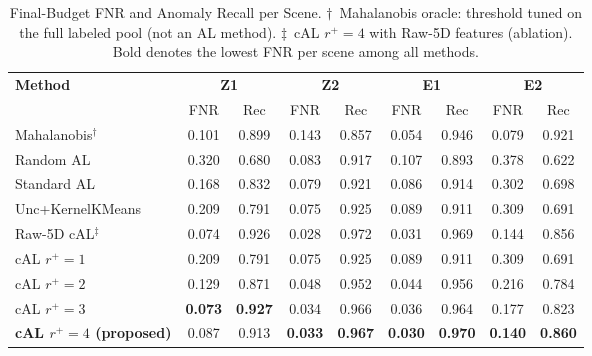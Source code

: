 %
\begin{table}[t]
\footnotesize
\centering
\caption{Final-Budget FNR and Anomaly Recall per Scene.
         $\dagger$~Mahalanobis oracle: threshold tuned on the full labeled
         pool (not an AL method).
         $\ddagger$~cAL $r^{+}=4$ with Raw-5D features (ablation).
         Bold denotes the lowest FNR per scene among all methods.}
\begin{tabular}{l c c c c c c c c}
    \toprule
    \multirow{2}{*}{\textbf{Method}}
        & \multicolumn{2}{c}{\textbf{Z1}}
        & \multicolumn{2}{c}{\textbf{Z2}}
        & \multicolumn{2}{c}{\textbf{E1}}
        & \multicolumn{2}{c}{\textbf{E2}} \\
    \cmidrule(lr){2-3}\cmidrule(lr){4-5}\cmidrule(lr){6-7}\cmidrule(lr){8-9}
        & FNR & Rec & FNR & Rec & FNR & Rec & FNR & Rec \\
    \midrule
    Mahalanobis$^\dagger$
        & 0.101 & 0.899 & 0.143 & 0.857 & 0.054 & 0.946 & 0.079 & 0.921 \\
    \midrule
    Random AL
        & 0.320 & 0.680 & 0.083 & 0.917 & 0.107 & 0.893 & 0.378 & 0.622 \\
    Standard AL
        & 0.168 & 0.832 & 0.079 & 0.921 & 0.086 & 0.914 & 0.302 & 0.698 \\
    Unc+KernelKMeans
        & 0.209 & 0.791 & 0.075 & 0.925 & 0.089 & 0.911 & 0.309 & 0.691 \\
    Raw-5D cAL$^\ddagger$
        & 0.074 & 0.926 & 0.028 & 0.972 & 0.031 & 0.969 & 0.144 & 0.856 \\
    \midrule
    cAL $r^{+}=1$
        & 0.209 & 0.791 & 0.075 & 0.925 & 0.089 & 0.911 & 0.309 & 0.691 \\
    cAL $r^{+}=2$
        & 0.129 & 0.871 & 0.048 & 0.952 & 0.044 & 0.956 & 0.216 & 0.784 \\
    cAL $r^{+}=3$
        & \textbf{0.073} & \textbf{0.927} & 0.034 & 0.966 & 0.036 & 0.964 & 0.177 & 0.823 \\
    \textbf{cAL $r^{+}=4$ (proposed)}
        & 0.087 & 0.913 & \textbf{0.033} & \textbf{0.967}
        & \textbf{0.030} & \textbf{0.970} & \textbf{0.140} & \textbf{0.860} \\
    \bottomrule
\end{tabular}
\label{tab:confusion_scene}
\end{table}


